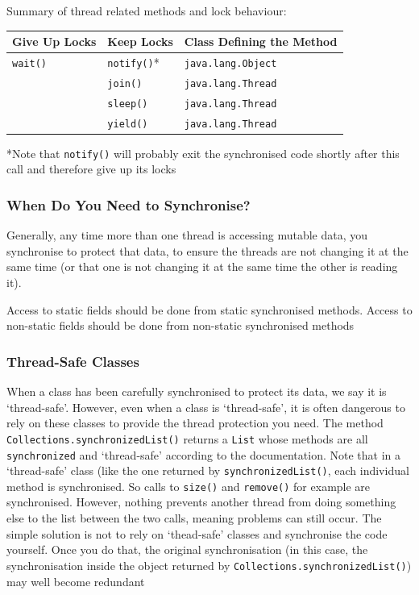Summary of thread related methods and lock behaviour:
\begin{center}
\begin{tabular}{lll}
    \textbf{Give Up Locks} & \textbf{Keep Locks} & \textbf{Class Defining the 
    Method} \\
    \hline
    \verb#wait()# & \verb#notify()#* & \verb#java.lang.Object# \\
    & \verb#join()# & \verb#java.lang.Thread# \\
    & \verb#sleep()# & \verb#java.lang.Thread# \\
    & \verb#yield()# & \verb#java.lang.Thread# \\
\end{tabular}
\end{center}
*Note that \verb#notify()# will probably exit the synchronised code shortly 
after this call and therefore give up its locks

\subsubsection{When Do You Need to Synchronise?}
Generally, any time more than one thread is accessing mutable data, you 
synchronise to protect that data, to ensure the threads are not changing it at 
the same time (or that one is not changing it at the same time the other is 
reading it).

Access to static fields should be done from static synchronised methods. Access 
to non-static fields should be done from non-static synchronised methods

\subsubsection{Thread-Safe Classes}
When a class has been carefully synchronised to protect its data, we say it is 
`thread-safe'. However, even when a class is `thread-safe', it is often 
dangerous to rely on these classes to provide the thread protection you need.  
The method \verb#Collections.synchronizedList()# returns a \verb#List# whose 
methods are all \verb#synchronized# and `thread-safe' according to the 
documentation. Note that in a `thread-safe' class (like the one returned by 
\verb#synchronizedList()#, each individual method is synchronised. So calls to 
\verb#size()# and \verb#remove()# for example are synchronised. However, 
nothing prevents another thread from doing something else to the list between 
the two calls, meaning problems can still occur. The simple solution is not to 
rely on `thead-safe' classes and synchronise the code yourself. Once you do 
that, the original synchronisation (in this case, the synchronisation inside 
the object returned by \verb#Collections.synchronizedList()#) may well become 
redundant

